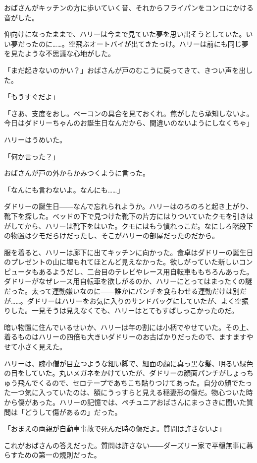 \documentclass[10pt,a4paper]{article}
\begin{document}
\begin{CJK}{UTF8}{min}
おばさんがキッチンの方に歩いていく音、それからフライパンをコンロにかける音がした。

仰向けになったままで、ハリーは今まで見ていた夢を思い出そうとしていた。いい夢だったのに……。空飛ぶオートバイが出てきたっけ。ハリーは前にも同じ夢を見たような不思議な心地がした。

「まだ起きないのかい？」おばさんが戸のむこうに戻ってきて、きつい声を出した。

「もうすぐだよ」

「さあ、支度をおし。ベーコンの具合を見ておくれ。焦がしたら承知しないよ。今日はダドリーちゃんのお誕生日なんだから、間違いのないようにしなくちゃ」

ハリーはうめいた。

「何か言った？」

おばさんが戸の外からかみつくように言った。

「なんにも言わないよ。なんにも……」

ダドリーの誕生日――なんで忘れられようか。ハリーはのろのろと起き上がり、靴下を探した。ベッドの下で見つけた靴下の片方にはりついていたクモを引きはがしてから、ハリーは靴下をはいた。クモにはもう慣れっこだ。なにしろ階段下の物置はクモだらけだったし、そこがハリーの部屋だったのだから。

服を着ると、ハリーは廊下に出てキッチンに向かった。食卓はダドリーの誕生日のプレゼントの山に埋もれてほとんど見えなかった。欲しがっていた新しいコンピュータもあるようだし、二台目のテレビやレース用自転車ももちろんあった。ダドリーがなぜレース用自転車を欲しがるのか、ハリーにとってはまったくの謎だった。太って運動嫌いなのに――誰かにパンチを食らわせる運動だけは別だが……。ダドリーはハリーをお気に入りのサンドバッグにしていたが、よく空振りした。一見そうは見えなくても、ハリーはとてもすばしっこかったのだ。

暗い物置に住んでいるせいか、ハリーは年の割には小柄でやせていた。その上、着るものはハリーの四倍も大きいダドリーのお古ばかりだったので、ますますやせて小さく見えた。

ハリーは、膝小僧が目立つような細い脚で、細面の顔に真っ黒な髪、明るい緑色の目をしていた。丸いメガネをかけていたが、ダドリーの顔面パンチがしょっちゅう飛んでくるので、セロテープであちこち貼りつけてあった。自分の顔でたった一つ気に入っていたのは、額にうっすらと見える稲妻形の傷だ。物心ついた時から傷があった。ハリーの記憶では、ペチュニアおばさんにまっさきに聞いた質問は「どうして傷があるの」だった。

「おまえの両親が自動車事故で死んだ時の傷だよ。質問は許さないよ」

これがおばさんの答えだった。質問は許さない――ダーズリー家で平穏無事に暮らすための第一の規則だった。


\end{CJK}
\end{document}
